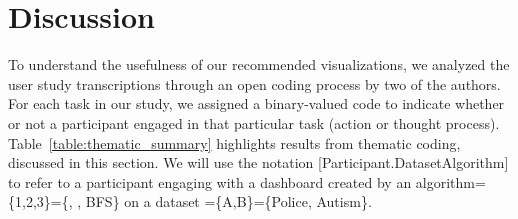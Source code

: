 \section{Discussion}
To understand the usefulness of our recommended visualizations, we analyzed the user study transcriptions through an open coding process by two of the authors. For each task in our study, we assigned a binary-valued code to indicate whether or not a participant engaged in that particular task (action or thought process). Table~\ref{table:thematic_summary} highlights results from thematic coding, discussed in this section. We will use the notation [Participant.DatasetAlgorithm] to refer to a participant engaging with a dashboard created by an algorithm=\{1,2,3\}=\{\system, \cluster, \textsc{BFS}\} on a dataset =\{A,B\}=\{Police, Autism\}.

